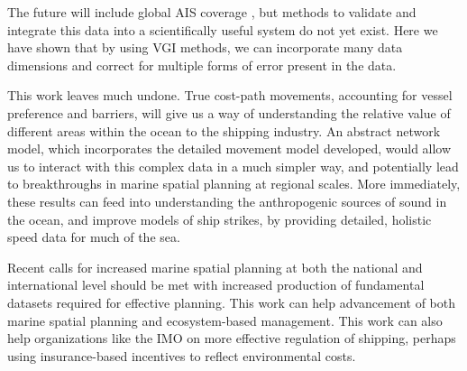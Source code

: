 

The future will include global AIS coverage \citep{JonesGoogle2012,carson2012satellite}, but methods to validate and integrate this data into a scientifically useful system do not yet exist. Here we have shown that by using VGI methods, we can incorporate many data dimensions and correct for multiple forms of error present in the data.

This work leaves much undone. True cost-path movements, accounting for vessel preference and barriers, will give us a way of understanding the relative value of different areas within the ocean to the shipping industry. An abstract network model, which incorporates the detailed movement model developed, would allow us to interact with this complex data in a much simpler way, and potentially lead to breakthroughs in marine spatial planning at regional scales. More immediately, these results can feed into understanding the anthropogenic sources of sound in the ocean, and improve models of ship strikes, by providing detailed, holistic speed data for much of the sea.

Recent calls for increased marine spatial planning at both the national and international level should be met with increased production of fundamental datasets required for effective planning. This work can help advancement of both marine spatial planning and ecosystem-based management. This work can also help organizations like the IMO on more effective regulation of shipping, perhaps using insurance-based incentives to reflect environmental costs.



